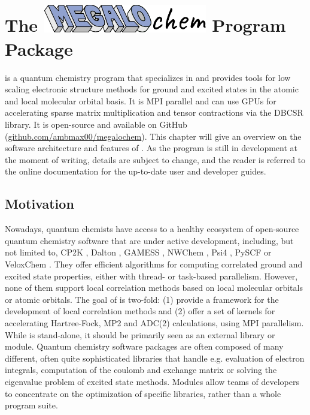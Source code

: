 \chapter[The \mchem Program Package]{The \protect\includegraphics[height=34pt]{Pics/MEGALOCHEM.pdf} Program Package}


\mchem{} is a quantum chemistry program that specializes in and provides tools for low scaling electronic structure methods for ground and excited states in the atomic and local molecular orbital basis. It is  MPI parallel and can use GPUs for accelerating sparse matrix multiplication and tensor contractions via the DBCSR library. It is open-source and available on GitHub (\url{github.com/ambmax00/megalochem}). This chapter will give an overview on the software architecture and features of \mchem{}. As the program is still in development at the moment of writing, details are subject to change, and the reader is referred to the online documentation for the up-to-date user and developer guides.

\section{Motivation}

Nowadays, quantum chemists have access to a healthy ecosystem of open-source quantum chemistry software that are under active development, including, but not limited to, CP2K \cite{}, Dalton \cite{}, GAMESS \cite{}, NWChem \cite{}, Psi4 \cite{}, PySCF \cite{} or VeloxChem \cite{}. They offer efficient algorithms for computing correlated ground and excited state properties, either with thread- or task-based parallelism. However, none of them support local correlation methods based on local molecular orbitals or atomic orbitals. The goal of \mchem{} is two-fold: (1) provide a framework for the development of local correlation methods and (2) offer a set of kernels for accelerating Hartree-Fock, MP2 and ADC(2) calculations, using MPI parallelism. While \mchem{} is stand-alone, it should be primarily seen as an external library or module. Quantum chemistry software packages are often composed of many different, often quite sophisticated libraries that handle e.g. evaluation of electron integrals, computation of the coulomb and exchange matrix or solving the eigenvalue problem of excited state methods. Modules allow teams of developers to concentrate on the optimization of specific libraries, rather than a whole program suite. %

